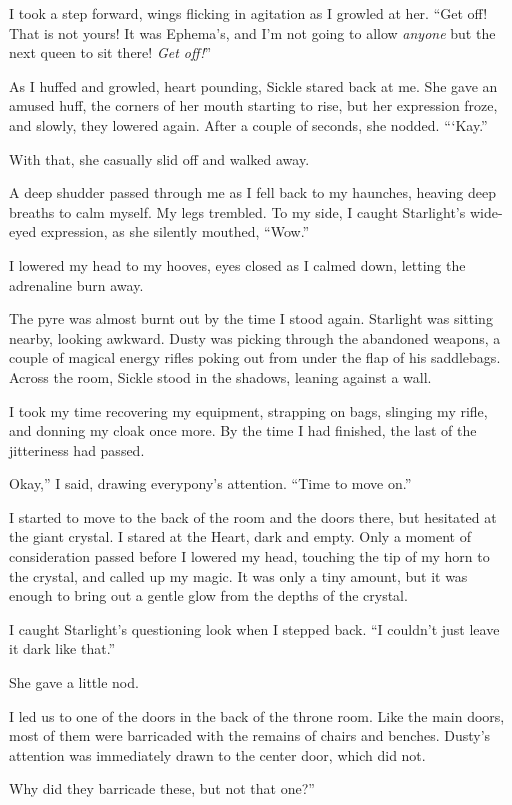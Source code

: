 I took a step forward, wings flicking in agitation as I growled at her. “Get off! That is not yours! It was Ephema’s, and I’m not going to allow \textit{anyone} but the next queen to sit there! \textit{Get off!}”

As I huffed and growled, heart pounding, Sickle stared back at me. She gave an amused huff, the corners of her mouth starting to rise, but her expression froze, and slowly, they lowered again. After a couple of seconds, she nodded. “‘Kay.”

With that, she casually slid off and walked away.

A deep shudder passed through me as I fell back to my haunches, heaving deep breaths to calm myself. My legs trembled. To my side, I caught Starlight’s wide-eyed expression, as she silently mouthed, “Wow.”

I lowered my head to my hooves, eyes closed as I calmed down, letting the adrenaline burn away.

The pyre was almost burnt out by the time I stood again. Starlight was sitting nearby, looking awkward. Dusty was picking through the abandoned weapons, a couple of magical energy rifles poking out from under the flap of his saddlebags. Across the room, Sickle stood in the shadows, leaning against a wall.

I took my time recovering my equipment, strapping on bags, slinging my rifle, and donning my cloak once more. By the time I had finished, the last of the jitteriness had passed.

\leavevmode{}Okay,” I said, drawing everypony’s attention. “Time to move on.”

I started to move to the back of the room and the doors there, but hesitated at the giant crystal. I stared at the Heart, dark and empty. Only a moment of consideration passed before I lowered my head, touching the tip of my horn to the crystal, and called up my magic. It was only a tiny amount, but it was enough to bring out a gentle glow from the depths of the crystal.

I caught Starlight’s questioning look when I stepped back. “I couldn’t just leave it dark like that.”

She gave a little nod.

I led us to one of the doors in the back of the throne room. Like the main doors, most of them were barricaded with the remains of chairs and benches. Dusty’s attention was immediately drawn to the center door, which did not.

\leavevmode{}Why did they barricade these, but not that one?”

